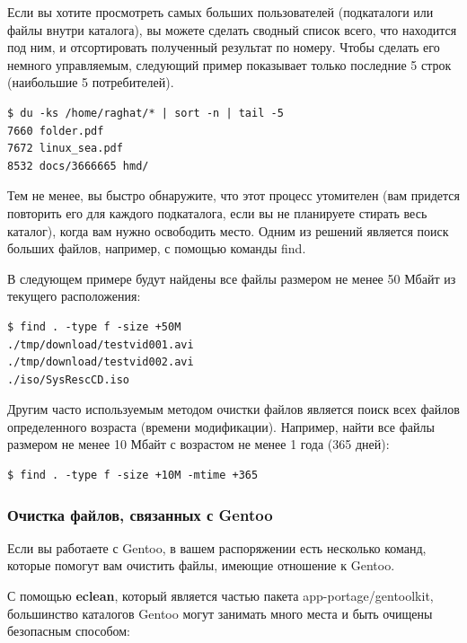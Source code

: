 \documentclass[10pt]{book}
\begin{document}
Если вы хотите просмотреть самых больших пользователей (подкаталоги или файлы внутри каталога), вы можете сделать сводный список всего, что находится под ним, и отсортировать полученный результат по номеру. Чтобы сделать его немного управляемым, следующий пример показывает только последние 5 строк (наибольшие 5 потребителей).

\begin{tcolorbox} 
\begin{lstlisting}
$ du -ks /home/raghat/* | sort -n | tail -5
7660 folder.pdf
7672 linux_sea.pdf 
8532 docs/3666665 hmd/
\end{lstlisting}
\end{tcolorbox}

Тем не менее, вы быстро обнаружите, что этот процесс утомителен (вам придется повторить его для каждого подкаталога, если вы не планируете стирать весь каталог), когда вам нужно освободить место. Одним из решений является поиск больших файлов, например, с помощью команды find.

В следующем примере будут найдены все файлы размером не менее 50 Мбайт из текущего расположения:

\begin{tcolorbox} 
\begin{lstlisting}
$ find . -type f -size +50M
./tmp/download/testvid001.avi
./tmp/download/testvid002.avi
./iso/SysRescCD.iso
\end{lstlisting}
\end{tcolorbox}

Другим часто используемым методом очистки файлов является поиск всех файлов определенного возраста (времени модификации). Например, найти все файлы размером не менее 10 Мбайт с возрастом не менее 1 года (365 дней):

\begin{tcolorbox} 
\begin{lstlisting}
$ find . -type f -size +10M -mtime +365
\end{lstlisting}
\end{tcolorbox}

\subsubsection{Очистка файлов, связанных с Gentoo}
Если вы работаете с Gentoo, в вашем распоряжении есть несколько команд, которые помогут вам очистить файлы, имеющие отношение к Gentoo.

С помощью \textbf{eclean}, который является частью пакета app-portage/gentoolkit, большинство каталогов Gentoo могут занимать много места и быть очищены безопасным способом:
\end{document}
